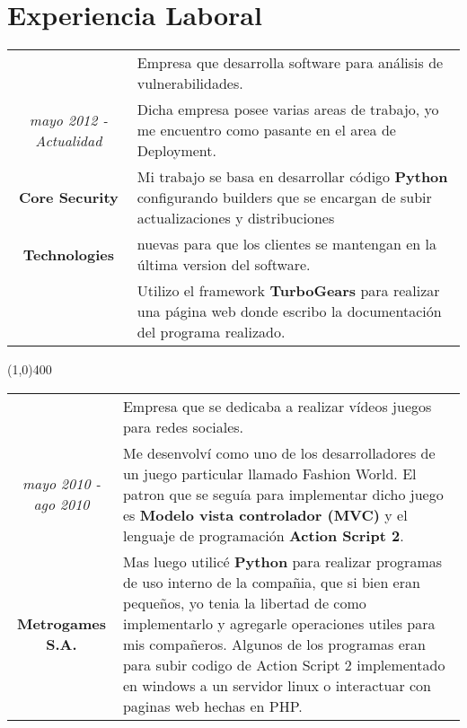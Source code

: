 \section{Experiencia Laboral}

\begin{tabular}{c|p{12.5cm}}
& \large Empresa que desarrolla software para análisis de vulnerabilidades.\\
\large\textit{mayo 2012 - Actualidad} &  \large Dicha empresa posee varias areas de trabajo, yo me encuentro como pasante en el area de Deployment.\\
\large\textbf{Core Security} & \large Mi trabajo se basa en desarrollar código \textbf{Python} configurando builders que se encargan de subir actualizaciones y distribuciones \\
\large\textbf{Technologies} & \large nuevas para que los clientes se mantengan en la última version del software. \\
& \large Utilizo el framework \textbf{TurboGears} para realizar una página web donde escribo la documentación del programa realizado.\\
\end{tabular}

\begin{center}
\line(1,0){400}
\end{center}
\noindent
\begin{tabular}{c|p{12.5cm}}
& \large Empresa que se dedicaba a realizar vídeos juegos para redes sociales.\\
\large\textit{mayo 2010 - ago 2010} &  \large Me desenvolví como uno de los desarrolladores de un juego particular llamado Fashion World. El patron que se seguía para implementar dicho juego es \textbf{Modelo vista controlador (MVC)} y el lenguaje de programación \textbf{Action Script 2}.\\
\large\textbf{Metrogames S.A.} & \large Mas luego utilicé \textbf{Python} para realizar programas de uso interno de la compañia, que si bien eran pequeños, yo tenia la libertad de como implementarlo y agregarle operaciones utiles para mis compañeros. Algunos de los programas eran para subir codigo de Action Script 2 implementado en windows a un servidor linux o interactuar con paginas web hechas en PHP.
\end{tabular}

